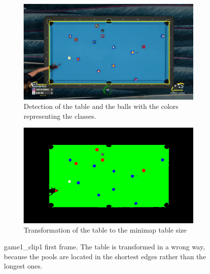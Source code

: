 \begin{figure}[H]
	\centering
	\begin{subfigure}[b]{0.48\textwidth}
		\centering
		\includegraphics[width=\textwidth]{images/TableOrientation/g1_c1.jpg}
		\caption{Detection of the table and the balls with the colors representing the classes.}
	\end{subfigure}
	\begin{subfigure}[b]{0.48\textwidth}
		\centering
		\includegraphics[width=\textwidth]{images/Segmentation/game1_clip1_segmented_balls_first_frame.jpg}
		\caption{Transformation of the table to the minimap table size}
	\end{subfigure}
	\caption{game1\_clip1 first frame. The table is transformed in a wrong way, because the pools are located in the shortest edges rather than the longest ones.}
	\label{fig:game1_clip1_orientation}
\end{figure}

